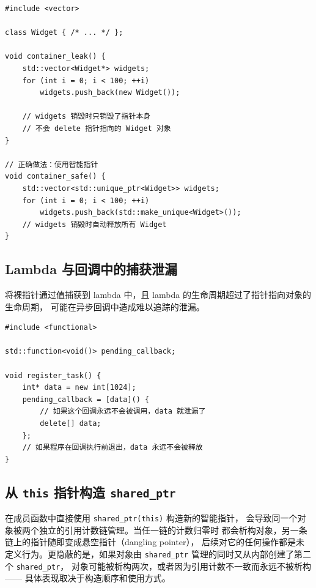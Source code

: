 \documentclass[12pt,a4paper,fontset=fandol]{ctexbook}
\begin{document}
\begin{lstlisting}[style=cppstyle, caption={vector 中的裸指针泄漏}]
#include <vector>

class Widget { /* ... */ };

void container_leak() {
    std::vector<Widget*> widgets;
    for (int i = 0; i < 100; ++i)
        widgets.push_back(new Widget());

    // widgets 销毁时只销毁了指针本身
    // 不会 delete 指针指向的 Widget 对象
}

// 正确做法：使用智能指针
void container_safe() {
    std::vector<std::unique_ptr<Widget>> widgets;
    for (int i = 0; i < 100; ++i)
        widgets.push_back(std::make_unique<Widget>());
    // widgets 销毁时自动释放所有 Widget
}
\end{lstlisting}

\subsection{Lambda 与回调中的捕获泄漏}

将裸指针通过值捕获到 lambda 中，且 lambda 的生命周期超过了指针指向对象的生命周期，
可能在异步回调中造成难以追踪的泄漏。

\begin{lstlisting}[style=cppstyle, caption={Lambda 捕获导致的泄漏}]
#include <functional>

std::function<void()> pending_callback;

void register_task() {
    int* data = new int[1024];
    pending_callback = [data]() {
        // 如果这个回调永远不会被调用，data 就泄漏了
        delete[] data;
    };
    // 如果程序在回调执行前退出，data 永远不会被释放
}
\end{lstlisting}


\subsection{从 \texttt{this} 指针构造 \texttt{shared\_ptr}}

在成员函数中直接使用 \texttt{shared\_ptr(this)} 构造新的智能指针，
会导致同一个对象被两个独立的引用计数链管理。当任一链的计数归零时
都会析构对象，另一条链上的指针随即变成悬空指针（dangling pointer），
后续对它的任何操作都是未定义行为。更隐蔽的是，如果对象由
\texttt{shared\_ptr} 管理的同时又从内部创建了第二个 \texttt{shared\_ptr}，
对象可能被析构两次，或者因为引用计数不一致而永远不被析构——
具体表现取决于构造顺序和使用方式。
\end{document}
